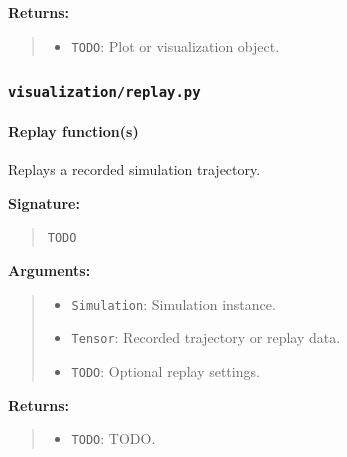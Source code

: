 \documentclass[11pt]{article}
\begin{document}
\textbf{Returns:}
\begin{quote}
\begin{itemize}
    \item \texttt{TODO}: Plot or visualization object.
\end{itemize}
\end{quote}


\subsubsection{\texttt{visualization/replay.py}}

\paragraph{Replay function(s)}

Replays a recorded simulation trajectory.

\textbf{Signature:}
\begin{quote}
\begin{verbatim}
TODO
\end{verbatim}
\end{quote}

\textbf{Arguments:}
\begin{quote}
\begin{itemize}
    \item \texttt{Simulation}: Simulation instance.
    \item \texttt{Tensor}: Recorded trajectory or replay data.
    \item \texttt{TODO}: Optional replay settings.
\end{itemize}
\end{quote}

\textbf{Returns:}
\begin{quote}
\begin{itemize}
    \item \texttt{TODO}: TODO.
\end{itemize}
\end{quote}



\clearpage
{}
{}

\nocite{*}

\end{document}
